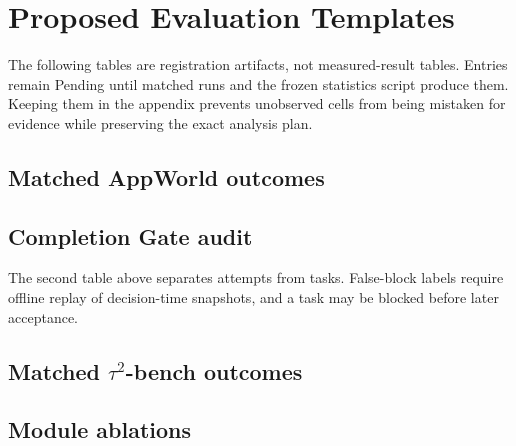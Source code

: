 \section{Proposed Evaluation Templates}
\label{app:prespecified}

The following tables are registration artifacts, not measured-result tables.
Entries remain Pending until matched runs and the frozen statistics script produce
them. Keeping them in the appendix prevents unobserved cells from being mistaken
for evidence while preserving the exact analysis plan.

\subsection{Matched AppWorld outcomes}


\subsection{Completion Gate audit}
The second table above separates attempts from tasks. False-block labels require
offline replay of decision-time snapshots, and a task may be blocked before later
acceptance.

\subsection{Matched \texorpdfstring{$\tau^2$-bench}{tau2-bench} outcomes}


\subsection{Module ablations}

